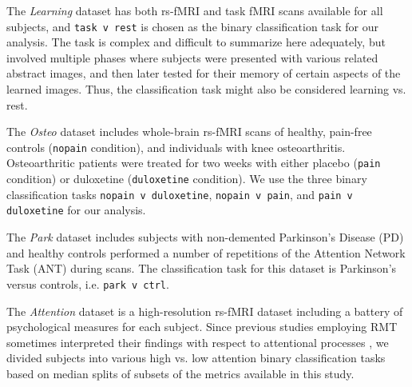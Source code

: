 \documentclass[12pt]{spieman}  %
\newcommand{\code}[1]{\small\texttt{#1}\normalsize}
\begin{document}
\begin{spacing}{2}
The \textit{Learning} dataset\cite{schapiroHumanHippocampalReplay2018,
schapiroHumanHippocampalReplay2020} has both rs-fMRI and task fMRI scans
available for all subjects, and \code{task v rest} is chosen as the binary
classification task for our analysis.  The task is complex and difficult to
summarize here adequately, but involved multiple phases where subjects were
presented with various related abstract images, and then later tested for their
memory of certain aspects of the learned images. Thus, the classification task
might also be considered learning vs. rest.



The \textit{Osteo} dataset\cite{tetreaultBrainConnectivityPredicts2016}
includes whole-brain rs-fMRI scans of healthy, pain-free controls
(\code{nopain} condition), and individuals with knee osteoarthritis.
Osteoarthritic patients were treated for two weeks with either placebo
(\code{pain} condition) or duloxetine (\code{duloxetine} condition).
We use the three binary classification tasks \code{nopain v duloxetine},
\code{nopain v pain}, and \code{pain v duloxetine} for our analysis.



The \textit{Park} dataset\cite{madhyasthaDynamicConnectivityRest2015} includes
subjects with non-demented Parkinson's Disease (PD) and
healthy controls performed a number of repetitions of the Attention Network
Task (ANT\cite{fanActivationAttentionalNetworks2005}) during scans.
The classification task for this dataset is Parkinson's versus controls, i.e.
\code{park v ctrl}.


The \textit{Attention} dataset\cite{gorgolewskiHighResolution7Tesla2015} is a
high-resolution rs-fMRI dataset including a battery of psychological measures
for each subject. Since previous studies employing RMT sometimes interpreted
their findings with respect to attentional processes
\cite{wangRandomMatrixTheory2016,matharooSpontaneousBackpainAlters2020}, we
divided subjects into various high vs. low attention binary classification
tasks based on median splits of subsets of the metrics available in this study.


\end{spacing}
\end{document}
